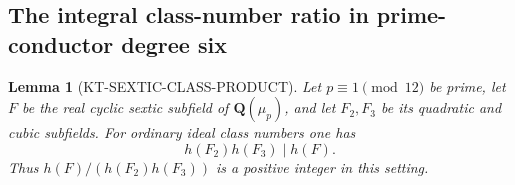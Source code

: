 \documentclass[11pt,a4paper]{article}
\newtheorem{lemma}[theorem]{Lemma}
\theoremstyle{definition}
\begin{document}


\subsection{The integral class-number ratio in prime-conductor degree six}

\begin{lemma}[KT-SEXTIC-CLASS-PRODUCT]
Let $p\equiv1\pmod{12}$ be prime, let $F$ be the real cyclic sextic
subfield of $\mathbf Q(\mu_p)$, and let $F_2,F_3$ be its quadratic
and cubic subfields.  For ordinary ideal class numbers one has
\[
                         h(F_2)h(F_3)\mid h(F).
 \tag{SC.1}
\]
Thus $h(F)/(h(F_2)h(F_3))$ is a positive integer in this setting.
\end{lemma}
\end{document}
